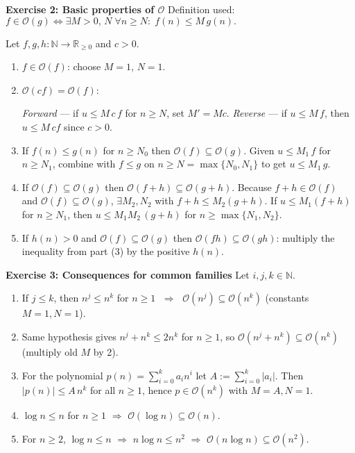 \documentclass{article}
\theoremstyle{theorem}
\theoremstyle{definition}
\theoremstyle{remark}
\begin{document}
\bigskip
\textbf{Exercise 2: Basic properties of \(\mathcal O\)}
Definition used: \(f\in\mathcal O(g)\iff\exists M>0,\,N\;\forall n\ge N:\;f(n)\le M\,g(n).\)

Let $f,g,h:\mathbb N\!\to\!\mathbb R_{\ge0}$ and $c>0$.

\begin{enumerate}
  \item $f\in\mathcal O(f)$: choose $M=1$, $N=1$.

  \item $\mathcal O(cf)=\mathcal O(f)$:  

        \emph{Forward} — if $u\le M\,c\,f$ for $n\ge N$, set $M'=Mc$.  
        \emph{Reverse} — if $u\le M\,f$, then $u\le M\,cf$ since $c>0$.

  \item If $f(n)\le g(n)$ for $n\ge N_0$ then $\mathcal O(f)\subseteq\mathcal O(g)$.  
        Given $u\le M_1\,f$ for $n\ge N_1$, combine with $f\le g$ on  
        $n\ge N=\max\{N_0,N_1\}$ to get $u\le M_1\,g$.

  \item If $\mathcal O(f)\subseteq\mathcal O(g)$ then  
        $\mathcal O(f+h)\subseteq\mathcal O(g+h)$.  
        Because $f+h\in\mathcal O(f)$ and $\mathcal O(f)\subseteq\mathcal O(g)$,  
        $\exists M_2,N_2$ with $f+h\le M_2(g+h)$.  
        If $u\le M_1(f+h)$ for $n\ge N_1$, then  
        $u\le M_1M_2\,(g+h)$ for $n\ge\max\{N_1,N_2\}$.

  \item If $h(n)>0$ and $\mathcal O(f)\subseteq\mathcal O(g)$ then  
        $\mathcal O(fh)\subseteq\mathcal O(gh)$:  
        multiply the inequality from part (3) by the positive $h(n)$.
\end{enumerate}

\bigskip
\textbf{Exercise 3: Consequences for common families}
Let $i,j,k\in\mathbb N$.

\begin{enumerate}
  \item If $j\le k$, then $n^{j}\le n^{k}$ for $n\ge1$  
        $\;\Rightarrow\;$ $\mathcal O(n^{j})\subseteq\mathcal O(n^{k})$  
        (constants $M=1,N=1$).

  \item Same hypothesis gives $n^{j}+n^{k}\le 2n^{k}$ for $n\ge1$,  
        so $\mathcal O(n^{j}+n^{k})\subseteq\mathcal O(n^{k})$  
        (multiply old $M$ by 2).

  \item For the polynomial $p(n)=\sum_{i=0}^{k}a_i n^{i}$ let  
        $A:=\sum_{i=0}^{k}|a_i|$.  Then  
        $\bigl|p(n)\bigr|\le A\,n^{k}$ for all $n\ge1$,  
        hence $p\in\mathcal O(n^{k})$ with $M=A,N=1$.

  \item $\log n \le n$ for $n\ge1$ $\Rightarrow$ $\mathcal O(\log n)\subseteq\mathcal O(n)$.

  \item For $n\ge2$, $\log n\le n$ $\Rightarrow$ $n\log n\le n^{2}$  
        $\Rightarrow$ $\mathcal O(n\log n)\subseteq\mathcal O(n^{2})$.
\end{enumerate}
\end{document}

